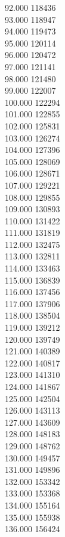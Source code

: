 { 92.000	118436 \\
 93.000	118947 \\
 94.000	119473 \\
 95.000	120114 \\
 96.000	120472 \\
 97.000	121141 \\
 98.000	121480 \\
 99.000	122007 \\
 100.000	122294 \\
 101.000	122855 \\
 102.000	125831 \\
 103.000	126274 \\
 104.000	127396 \\
 105.000	128069 \\
 106.000	128671 \\
 107.000	129221 \\
 108.000	129855 \\
 109.000	130893 \\
 110.000	131422 \\
 111.000	131819 \\
 112.000	132475 \\
 113.000	132811 \\
 114.000	133463 \\
 115.000	136839 \\
 116.000	137456 \\
 117.000	137906 \\
 118.000	138504 \\
 119.000	139212 \\
 120.000	139749 \\
 121.000	140389 \\
 122.000	140817 \\
 123.000	141310 \\
 124.000	141867 \\
 125.000	142504 \\
 126.000	143113 \\
 127.000	143609 \\
 128.000	148183 \\
 129.000	148762 \\
 130.000	149457 \\
 131.000	149896 \\
 132.000	153342 \\
 133.000	153368 \\
 134.000	155164 \\
 135.000	155938 \\
 136.000	156424 \\
}

